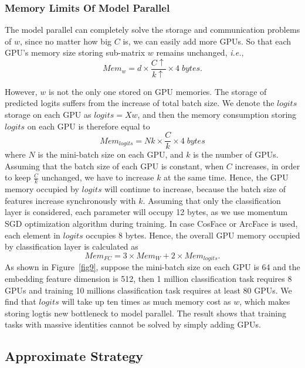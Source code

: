 \documentclass[letterpaper]{article} \usepackage{style/aaai21}  \usepackage{times}  \usepackage{helvet} \usepackage{courier}  \usepackage[hyphens]{url}  \usepackage{graphicx} \usepackage{color}
\begin{document}
\subsubsection{Memory Limits Of Model Parallel}
The model parallel can completely solve  the storage and communication problems of $w$, since no matter how big $C$ is, we can easily add more GPUs. So that each GPU's memory size storing sub-matrix $w$ remains unchanged, \emph{i.e.},  \begin{equation}
Mem_w = d \times \frac{C \uparrow}{k \uparrow} \times 4 \; bytes. \label{memory_weight}
\end{equation}

However, $w$ is not the only one stored on GPU memories. The storage of predicted logits suffers from the increase of total batch size. We denote the $logits$ storage on each GPU as $logits=Xw$, and then the memory consumption storing $logits$ on each GPU is therefore equal to 
\begin{equation}
Mem_{logits} = Nk \times \frac{C}{k} \times 4 \; bytes
\end{equation} 
where $N$ is the mini-batch size on each GPU, and $k$ is the number of GPUs. Assuming that the batch size of each GPU is constant, when $C$ increases, in order to keep $\frac{C}{k}$ unchanged, we have to increase $k$ at the same time. Hence, the GPU memory occupied by $logits$ will continue to increase, because the batch size of features increase synchronously with $k$. 
Assuming that only the classification layer is considered, each parameter will occupy 12 bytes, as we use momentum SGD optimization algorithm during training. In case CosFace \cite{wang2018cosface} or ArcFace \cite{deng2019arcface} is used, each element in $logits$ occupies 8 bytes. Hence, the overall GPU memory occupied by classification layer is calculated as  
\begin{equation}
Mem_{FC} = 3 \times Mem_{W}+2\times Mem_{logits}.
\end{equation}
As shown in Figure~\ref{fig9}, suppose the mini-batch size on each GPU is 64 and the embedding feature dimension is 512, then 1 million classification task requires 8 GPUs and training 10 millions classification task requires at least 80 GPUs. We find that $logits$ will take up ten times as much memory cost as $w$, which makes storing logtis new bottleneck to model parallel. The result shows that training tasks with massive identities cannot be solved by simply adding GPUs.


\subsection{Approximate Strategy}
\end{document}
